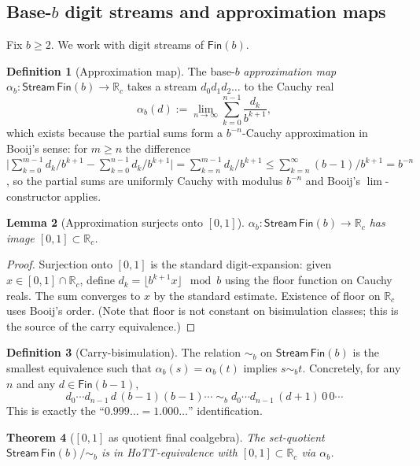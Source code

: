 \documentclass[12pt]{article}
\newtheorem{theorem}{Theorem}[section]
\newtheorem{lemma}[theorem]{Lemma}
\theoremstyle{definition}
\newtheorem{definition}[theorem]{Definition}
\theoremstyle{remark}
\newcommand{\R}{\mathbb{R}}
\newcommand{\Rc}{\R_c}
\newcommand{\Stream}{\mathsf{Stream}}
\newcommand{\bisim}{\mathrel{\sim}}
\begin{document}
\subsection{\texorpdfstring{Base-$b$ digit streams and approximation maps}{Base-b digit streams and approximation maps}}

Fix $b \geq 2$. We work with digit streams of $\mathsf{Fin}(b)$.

\begin{definition}[Approximation map]\label{def:approx}
The base-$b$ \emph{approximation map}
$\alpha_b: \Stream\,\mathsf{Fin}(b) \to \Rc$ takes a stream
$d_0 d_1 d_2 \dots$ to the Cauchy real
\[
\alpha_b(d) := \lim_{n\to\infty}\sum_{k=0}^{n-1}\frac{d_k}{b^{k+1}},
\]
which exists because the partial sums form a $b^{-n}$-Cauchy
approximation in Booij's sense: for $m \geq n$ the difference
$\bigl|\sum_{k=0}^{m-1}\!d_k/b^{k+1} - \sum_{k=0}^{n-1}\!d_k/b^{k+1}\bigr|
= \sum_{k=n}^{m-1}\!d_k/b^{k+1} \leq \sum_{k=n}^{\infty}(b-1)/b^{k+1} = b^{-n}$,
so the partial sums are uniformly Cauchy with modulus $b^{-n}$
and Booij's $\lim$-constructor applies.
\end{definition}

\begin{lemma}[Approximation surjects onto ${[0,1]}$]\label{lem:approx-surj}
$\alpha_b: \Stream\,\mathsf{Fin}(b) \to \Rc$ has image $[0,1]\subset\Rc$.
\end{lemma}

\begin{proof}
Surjection onto $[0,1]$ is the standard digit-expansion: given
$x\in[0,1]\cap \Rc$, define $d_k = \lfloor b^{k+1} x\rfloor \mod b$
using the floor function on Cauchy reals. The sum converges
to $x$ by the standard estimate. Existence of floor on $\Rc$
uses Booij's order. (Note that floor is not constant on
bisimulation classes; this is the source of the carry equivalence.)
\end{proof}

\begin{definition}[Carry-bisimulation]\label{def:carry}
The relation $\bisim_b$ on $\Stream\,\mathsf{Fin}(b)$ is the smallest
equivalence such that $\alpha_b(s) = \alpha_b(t)$ implies
$s \bisim_b t$. Concretely, for any $n$ and any $d\in\mathsf{Fin}(b-1)$,
\[
d_0\cdots d_{n-1}\,d\,(b{-}1)(b{-}1)\cdots
\;\bisim_b\;
d_0\cdots d_{n-1}\,(d{+}1)\,0\,0\cdots
\]
This is exactly the ``$0.999\ldots = 1.000\ldots$'' identification.
\end{definition}

\begin{theorem}[${[0,1]}$ as quotient final coalgebra]\label{thm:01-quotient}
The set-quotient $\Stream\,\mathsf{Fin}(b)/{\bisim_b}$ is in
HoTT-equivalence with $[0,1] \subset \Rc$ via $\alpha_b$.
\end{theorem}
\end{document}
